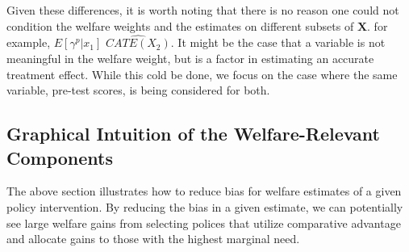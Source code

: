 \documentclass[12pt]{article}
\theoremstyle{definition}
\theoremstyle{definition}
\theoremstyle{definition}
\theoremstyle{definition}
\begin{document}

   Given these differences, it is worth noting that there is no reason one could not condition the welfare weights and the estimates on different subsets of $\bm{X}$. for example, $E[\gamma^p|x_1]$ $\widehat{CATE(X_2)}$. It might be the case that a variable is not meaningful in the welfare weight, but is a factor in estimating an accurate treatment effect. While this cold be done, we focus on the case where the same variable, pre-test scores, is being considered for both. 
   

\subsection{Graphical Intuition of the Welfare-Relevant Components}

The above section illustrates how to reduce bias for welfare estimates of a given policy intervention. By reducing the bias in a given estimate, we can potentially see large welfare gains from selecting polices that utilize comparative advantage and allocate gains to those with the highest marginal need. 
    
\end{document}
